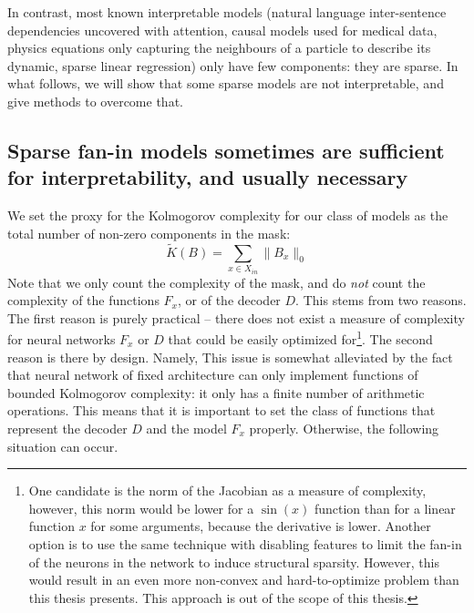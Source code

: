 \documentclass[a4paper,11pt,oneside]{report}
\begin{document}
In contrast, most known interpretable models (natural language inter-sentence dependencies uncovered with attention, causal models used for medical data, physics equations only capturing the neighbours of a particle to describe its dynamic, sparse linear regression) only have few components: they are sparse. In what follows, we will show that some sparse models are not interpretable, and give methods to overcome that.

\subsection{Sparse fan-in models sometimes are sufficient for interpretability, and usually necessary}
We set the proxy for the Kolmogorov complexity for our class of models as the total number of non-zero components in the mask:
$$
\tilde{K}(B)=\sum\limits_{x\in X_{in}}\|B_x\|_0
$$
Note that we only count the complexity of the mask, and do {\em not} count the complexity of the functions $F_x$, or of the decoder $D$. This stems from two reasons. The first reason is purely practical -- there does not exist a measure of complexity for neural networks $F_x$ or $D$ that could be easily optimized for\footnote{One candidate is the norm of the Jacobian as a measure of complexity, however, this norm would be lower for a $\sin(x)$ function than for a linear function $x$ for some arguments, because the derivative is lower. Another option is to use the same technique with disabling features to limit the fan-in of the neurons in the network to induce structural sparsity. However, this would result in an even more non-convex and hard-to-optimize problem than this thesis presents. This approach is out of the scope of this thesis.}. The second reason is there by design. Namely,
This issue is somewhat alleviated by the fact that neural network of fixed architecture can only implement functions of bounded Kolmogorov complexity: it only has a finite number of arithmetic operations. This means that it is important to set the class of functions that represent the decoder $D$ and the model $F_x$ properly. Otherwise, the following situation can occur.
\end{document}
